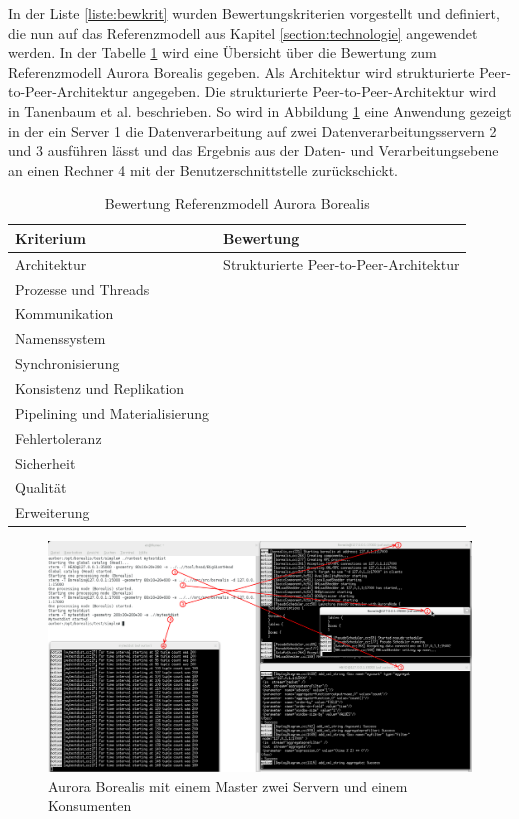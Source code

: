 In der Liste \ref{liste:bewkrit} wurden Bewertungskriterien vorgestellt und definiert, die nun auf das Referenzmodell aus Kapitel \ref{section:technologie} angewendet werden. In der Tabelle \ref{tab:bewrefaurbor} wird eine Übersicht über die Bewertung zum Referenzmodell Aurora Borealis gegeben. Als Architektur wird strukturierte Peer-to-Peer-Architektur angegeben. Die strukturierte Peer-to-Peer-Architektur wird in Tanenbaum et al.  beschrieben. So wird in Abbildung \ref{fig:aurborinaction} eine Anwendung gezeigt in der ein Server 1 die Datenverarbeitung auf zwei Datenverarbeitungsservern 2 und 3 ausführen lässt und das Ergebnis aus der Daten- und Verarbeitungsebene an einen Rechner 4 mit der Benutzerschnittstelle zurückschickt.


\begin{table}[htbp]
	\centering
		\begin{tabular}{@{}ll@{}} \toprule
			\textbf{Kriterium} & \textbf{Bewertung} \\ \midrule
			Architektur & Strukturierte Peer-to-Peer-Architektur \\
			Prozesse und Threads &  \\ 
			Kommunikation &  \\
			Namenssystem &  \\
			Synchronisierung &  \\
			Konsistenz und Replikation &  \\
			Pipelining und Materialisierung &  \\
			Fehlertoleranz &  \\
			Sicherheit &  \\
			Qualität &  \\
			Erweiterung &  \\
			\bottomrule			
		\end{tabular}
	\caption{Bewertung Referenzmodell Aurora Borealis}
	\label{tab:bewrefaurbor}
\end{table}



\begin{figure}[htb!]
\centering
\includegraphics[width=1.0\textwidth]{bilder/auroraborealisinaction.png}
\caption{Aurora Borealis mit einem Master zwei Servern und einem Konsumenten
\label{fig:aurborinaction}}
\end{figure}



